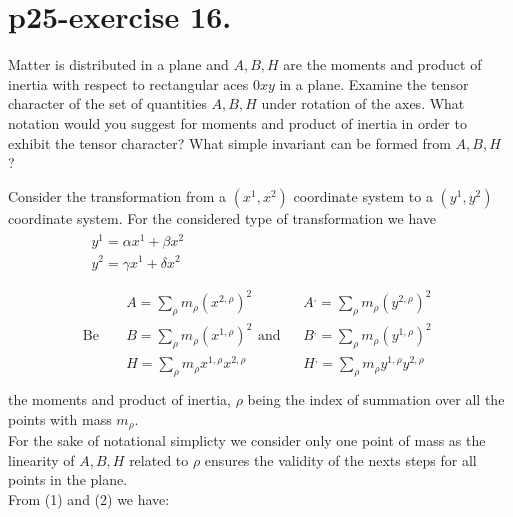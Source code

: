 \section{p25-exercise 16.}
\begin{tcolorbox}
Matter is distributed in a plane and $A,B,H$ are the moments and product of inertia with respect to rectangular aces $0xy$ in a plane. Examine the tensor character of the set of quantities $A,B,H$ under rotation of the axes. What notation would you suggest for moments and product of inertia in order to exhibit the tensor character? What simple invariant can be formed from $A,B,H$ ?
\end{tcolorbox}
Consider the transformation from a $(x^1,x^2)$ coordinate system to a $(y^1,y^2)$ coordinate system. For the considered type of transformation we have
\begin {align}
\begin{array}{c}
\ y^1 = \alpha x^1 + \beta x^2\\
\ y^2 = \gamma x^1 + \delta x^2\\
  \end{array}\\
  \text{Be }\quad  \begin{array}{c}
  \ A = \sum_{\rho} m_{\rho} (x^{2,\rho})^2\\
  \ B = \sum_{\rho} m_{\rho} (x^{1,\rho})^2\\
  \ H = \sum_{\rho} m_{\rho} x^{1,\rho} x^{2,\rho}\\
  \end{array}
    \text{and}\quad  \begin{array}{c}
  \ A^, = \sum_{\rho} m_{\rho} (y^{2,\rho})^2\\
  \ B^, = \sum_{\rho} m_{\rho} (y^{1,\rho})^2\\
  \ H^, = \sum_{\rho} m_{\rho} y^{1,\rho} y^{2,\rho}\\
  \end{array}
\end{align}
the moments and product of inertia, $\rho$ being the index of summation over all the points with mass $m_{\rho}$.\\
For the sake of notational simplicty we consider only one point of mass as the linearity of $A, B, H$ related to $\rho$ ensures the validity of the nexts steps for all points in the plane.\\
From (1) and (2) we have:
